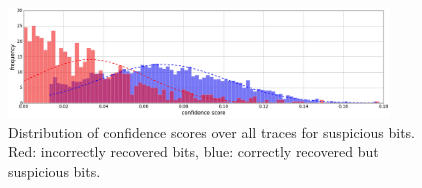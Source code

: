 
\begin{figure}[h!tb]
	\centering   %
	\includegraphics[width=0.9\textwidth]{figures/SAC_2016__pointer_cswap_attack__hist-conf-all-traces__n_trset_40.png}
	\caption{Distribution of confidence scores over all traces for suspicious bits. Red: incorrectly recovered bits, blue: correctly recovered but suspicious bits.}
	\vspace{.5mm}
	\label{fig:hist-conf-all-traces__n_trset_40}
\end{figure}

